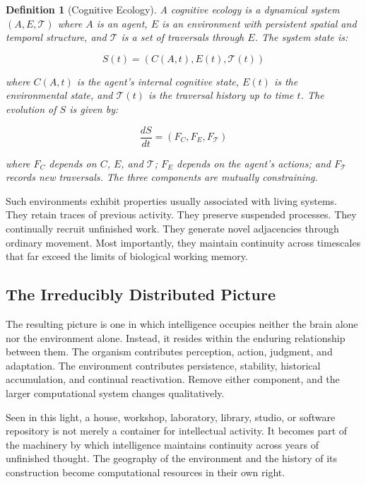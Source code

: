 \documentclass[12pt,oneside]{article}
\newtheorem{definition}{Definition}[section]
\theoremstyle{remark}
\begin{document}
\begin{definition}[Cognitive Ecology]
A cognitive ecology is a dynamical system $(A, E, \mathcal{T})$ where $A$ is an agent, $E$ is an environment with persistent spatial and temporal structure, and $\mathcal{T}$ is a set of traversals through $E$. The system state is:

\begin{equation}
S(t) = (C(A, t), E(t), \mathcal{T}(t))
\end{equation}

where $C(A, t)$ is the agent's internal cognitive state, $E(t)$ is the environmental state, and $\mathcal{T}(t)$ is the traversal history up to time $t$. The evolution of $S$ is given by:

\begin{equation}
\frac{dS}{dt} = (F_C, F_E, F_{\mathcal{T}})
\end{equation}

where $F_C$ depends on $C$, $E$, and $\mathcal{T}$; $F_E$ depends on the agent's actions; and $F_{\mathcal{T}}$ records new traversals. The three components are mutually constraining.
\end{definition}

Such environments exhibit properties usually associated with living systems. They retain traces of previous activity. They preserve suspended processes. They continually recruit unfinished work. They generate novel adjacencies through ordinary movement. Most importantly, they maintain continuity across timescales that far exceed the limits of biological working memory.

\subsection{The Irreducibly Distributed Picture}

The resulting picture is one in which intelligence occupies neither the brain alone nor the environment alone. Instead, it resides within the enduring relationship between them. The organism contributes perception, action, judgment, and adaptation. The environment contributes persistence, stability, historical accumulation, and continual reactivation. Remove either component, and the larger computational system changes qualitatively.

Seen in this light, a house, workshop, laboratory, library, studio, or software repository is not merely a container for intellectual activity. It becomes part of the machinery by which intelligence maintains continuity across years of unfinished thought. The geography of the environment and the history of its construction become computational resources in their own right.
\end{document}
